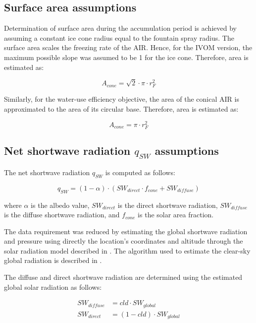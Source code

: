 \subsection{Surface area assumptions}

Determination of surface area during the accumulation period is achieved by assuming a constant ice cone
radius equal to the fountain spray radius. The surface area scales the freezing rate of the AIR. Hence, for the
IVOM version, the maximum possible slope was assumed to be 1 for the ice cone. Therefore, area is estimated as:  

\begin{equation} A_{cone} =\sqrt{2} \cdot \pi \cdot r_{F}^2  \end{equation}

Similarly, for the water-use efficiency objective, the area of the conical AIR is approximated to the area of
its circular base. Therefore, area is estimated as:

\begin{equation} A_{cone} =\pi \cdot r_{F}^2  \end{equation}

\subsection{Net shortwave radiation \texorpdfstring{$q_{SW}$}{Lg} assumptions}
\label{sec:SW}

The net shortwave radiation $q_{SW}$ is computed as follows:

\begin{equation} 
q_{SW} = (1- \alpha) \cdot ( SW_{direct} \cdot f_{cone} + SW_{diffuse})
\end{equation}

where $\alpha$ is the albedo value, $SW_{direct}$ is the direct shortwave radiation, $SW_{diffuse}$ is the
diffuse shortwave radiation, and $f_{cone}$ is the solar area fraction.

The data requirement was reduced by estimating the global shortwave radiation and pressure using directly the
location's coordinates and altitude through the solar radiation model described in
\citet{holmgrenPvlibPythonPython2018}. The algorithm used to estimate the clear-sky global radiation is
described in \citet{ineichenBroadbandSimplifiedVersion2008}.  

The diffuse and direct shortwave radiation are determined using the estimated global solar radiation as follows:

\begin{equation}
\begin{split}
  SW_{diffuse} &= cld \cdot SW_{global}\\
  SW_{direct} &= (1-cld) \cdot SW_{global}
\end{split}
\end{equation}

